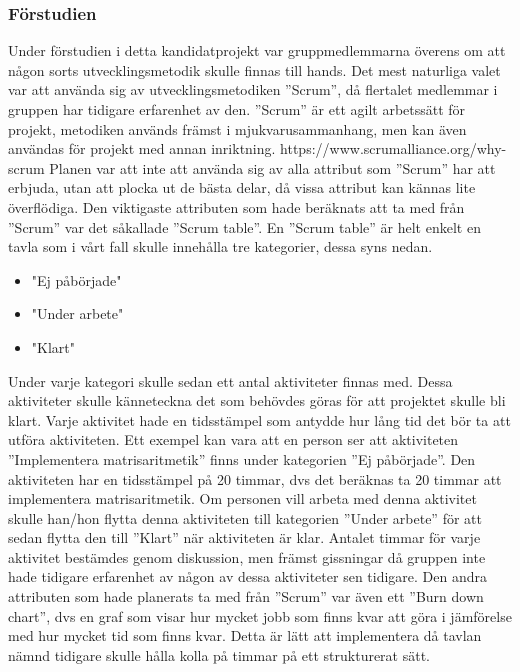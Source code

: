 \subsubsection{Förstudien}
Under förstudien i detta kandidatprojekt var gruppmedlemmarna överens om att någon sorts utvecklingsmetodik skulle finnas till hands. Det mest naturliga valet var att använda sig av utvecklingsmetodiken ''Scrum'', då flertalet medlemmar i gruppen har tidigare erfarenhet av den. ''Scrum'' är ett agilt arbetssätt för projekt, metodiken används främst i mjukvarusammanhang, men kan även användas för projekt med annan inriktning. https://www.scrumalliance.org/why-scrum
\newline
\newline
Planen var att inte att använda sig av alla attribut som ''Scrum'' har att erbjuda, utan att plocka ut de bästa delar, då vissa attribut kan kännas lite överflödiga. Den viktigaste attributen som hade beräknats att ta med från ''Scrum'' var det såkallade ''Scrum table''. En ''Scrum table'' är helt enkelt en tavla som i vårt fall skulle innehålla tre kategorier, dessa syns nedan.
\begin{itemize}
  \item "Ej påbörjade"
  \item "Under arbete"
  \item "Klart"
\end{itemize}
Under varje kategori skulle sedan ett antal aktiviteter finnas med. Dessa aktiviteter skulle känneteckna det som behövdes göras för att projektet skulle bli klart. Varje aktivitet hade en tidsstämpel som antydde hur lång tid det bör ta att utföra aktiviteten. Ett exempel kan vara att en person ser att aktiviteten ''Implementera matrisaritmetik'' finns under kategorien ''Ej påbörjade''. Den aktiviteten har en tidsstämpel på 20 timmar, dvs det beräknas ta 20 timmar att implementera matrisaritmetik. Om personen vill arbeta med denna aktivitet skulle han/hon flytta denna aktiviteten till kategorien ''Under arbete'' för att sedan flytta den till ''Klart'' när aktiviteten är klar. Antalet timmar för varje aktivitet bestämdes genom diskussion, men främst gissningar då gruppen inte hade tidigare erfarenhet av någon av dessa aktiviteter sen tidigare.
\newline
\newline
Den andra attributen som hade planerats ta med från ''Scrum'' var även ett ''Burn down chart'', dvs en graf som visar hur mycket jobb som finns kvar att göra i jämförelse med hur mycket tid som finns kvar. Detta är lätt att implementera då tavlan nämnd tidigare skulle hålla kolla på timmar på ett strukturerat sätt. 
